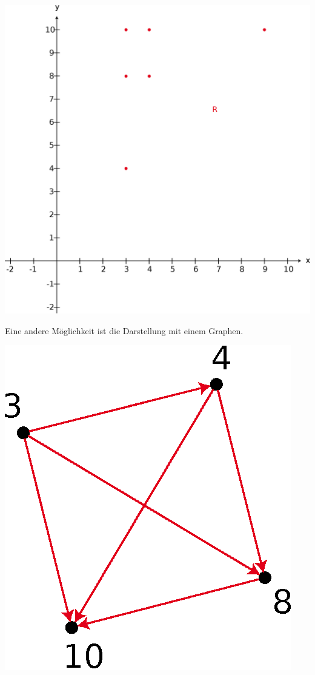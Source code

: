 \documentclass{report}
\begin{document}
\begin{center}\includegraphics[scale=0.25]{img/3-r-in-cartesian-grid.eps}\end{center}
Eine andere Möglichkeit ist die Darstellung mit einem Graphen.
\begin{center}\includegraphics[scale=0.25]{img/3-r-as-graph-def.eps}\end{center}
\end{document}
